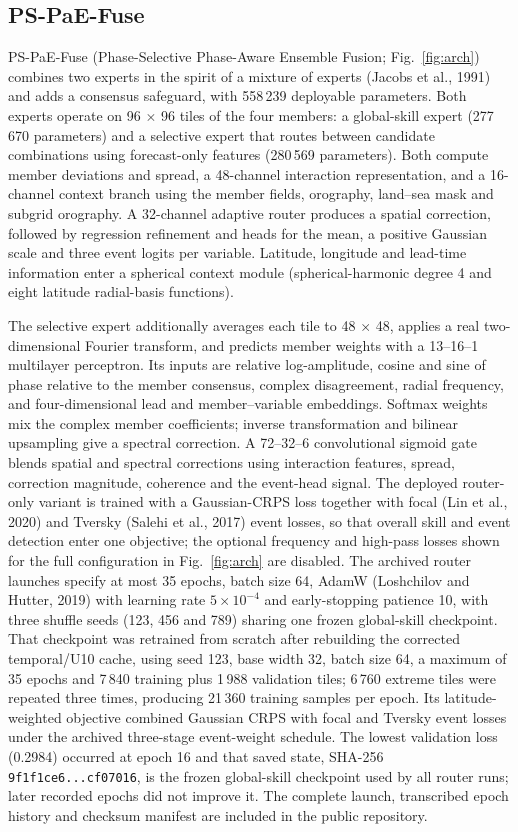 \documentclass[12pt]{article}
\begin{document}
\subsection{PS-PaE-Fuse}
\label{sec:model}

PS-PaE-Fuse (Phase-Selective Phase-Aware Ensemble Fusion; Fig.~\ref{fig:arch}) combines two experts in the spirit of a mixture of experts (Jacobs et al., 1991) and adds a consensus safeguard, with 558\,239 deployable parameters. Both experts operate on 96 $\times$ 96 tiles of the four members: a global-skill expert (277\,670 parameters) and a selective expert that routes between candidate combinations using forecast-only features (280\,569 parameters). Both compute member deviations and spread, a 48-channel interaction representation, and a 16-channel context branch using the member fields, orography, land--sea mask and subgrid orography. A 32-channel adaptive router produces a spatial correction, followed by regression refinement and heads for the mean, a positive Gaussian scale and three event logits per variable. Latitude, longitude and lead-time information enter a spherical context module (spherical-harmonic degree 4 and eight latitude radial-basis functions).

The selective expert additionally averages each tile to 48 $\times$ 48, applies a real two-dimensional Fourier transform, and predicts member weights with a 13--16--1 multilayer perceptron. Its inputs are relative log-amplitude, cosine and sine of phase relative to the member consensus, complex disagreement, radial frequency, and four-dimensional lead and member--variable embeddings. Softmax weights mix the complex member coefficients; inverse transformation and bilinear upsampling give a spectral correction. A 72--32--6 convolutional sigmoid gate blends spatial and spectral corrections using interaction features, spread, correction magnitude, coherence and the event-head signal. The deployed router-only variant is trained with a Gaussian-CRPS loss together with focal (Lin et al., 2020) and Tversky (Salehi et al., 2017) event losses, so that overall skill and event detection enter one objective; the optional frequency and high-pass losses shown for the full configuration in Fig.~\ref{fig:arch} are disabled. The archived router launches specify at most 35 epochs, batch size 64, AdamW (Loshchilov and Hutter, 2019) with learning rate $5\times10^{-4}$ and early-stopping patience 10, with three shuffle seeds (123, 456 and 789) sharing one frozen global-skill checkpoint. That checkpoint was retrained from scratch after rebuilding the corrected temporal/U10 cache, using seed 123, base width 32, batch size 64, a maximum of 35 epochs and 7\,840 training plus 1\,988 validation tiles; 6\,760 extreme tiles were repeated three times, producing 21\,360 training samples per epoch. Its latitude-weighted objective combined Gaussian CRPS with focal and Tversky event losses under the archived three-stage event-weight schedule. The lowest validation loss (0.2984) occurred at epoch 16 and that saved state, SHA-256 \texttt{9f1f1ce6...cf07016}, is the frozen global-skill checkpoint used by all router runs; later recorded epochs did not improve it. The complete launch, transcribed epoch history and checksum manifest are included in the public repository.
\end{document}
